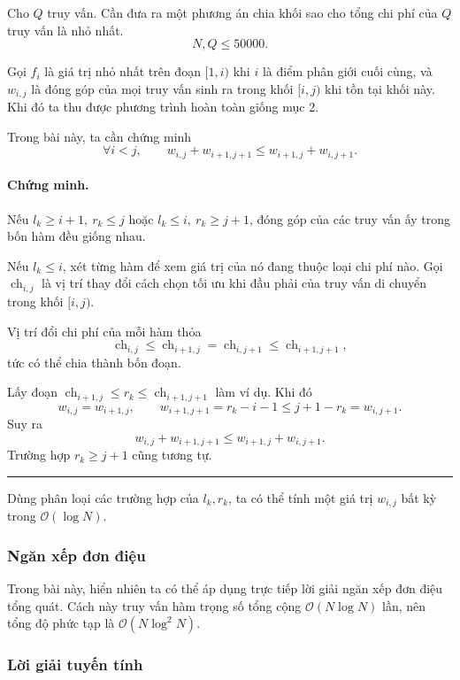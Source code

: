 \documentclass[11pt]{article}
\newcommand{\Oh}{\mathcal{O}}
\newcommand{\qedmark}{\hfill\rule{0.7ex}{0.7ex}}
\begin{document}
Cho \(Q\) truy vấn. Cần đưa ra một phương án chia khối sao cho tổng chi phí
của \(Q\) truy vấn là nhỏ nhất.
\[
  N,Q\le 50000.
\]

Gọi \(f_i\) là giá trị nhỏ nhất trên đoạn \([1,i)\) khi \(i\) là điểm phân
giới cuối cùng, và \(w_{i,j}\) là đóng góp của mọi truy vấn sinh ra trong khối
\([i,j)\) khi tồn tại khối này. Khi đó ta thu được phương trình hoàn toàn giống
mục 2.

Trong bài này, ta cần chứng minh
\[
  \forall i<j,\qquad
  w_{i,j}+w_{i+1,j+1}\le w_{i+1,j}+w_{i,j+1}.
\]

\paragraph{Chứng minh.}
Nếu \(l_k\ge i+1,\ r_k\le j\) hoặc \(l_k\le i,\ r_k\ge j+1\), đóng góp của các
truy vấn ấy trong bốn hàm đều giống nhau.

Nếu \(l_k\le i\), xét từng hàm để xem giá trị của nó đang thuộc loại chi phí
nào. Gọi \(\operatorname{ch}_{i,j}\) là vị trí thay đổi cách chọn tối ưu khi
đầu phải của truy vấn di chuyển trong khối \([i,j)\).

Vị trí đổi chi phí của mỗi hàm thỏa
\[
  \operatorname{ch}_{i,j}\le \operatorname{ch}_{i+1,j}
  =\operatorname{ch}_{i,j+1}\le \operatorname{ch}_{i+1,j+1},
\]
tức có thể chia thành bốn đoạn.

Lấy đoạn
\(\operatorname{ch}_{i+1,j}\le r_k\le \operatorname{ch}_{i+1,j+1}\) làm ví
dụ. Khi đó
\[
  w_{i,j}=w_{i+1,j},\qquad
  w_{i+1,j+1}=r_k-i-1\le j+1-r_k=w_{i,j+1}.
\]
Suy ra
\[
  w_{i,j}+w_{i+1,j+1}\le w_{i+1,j}+w_{i,j+1}.
\]
Trường hợp \(r_k\ge j+1\) cũng tương tự. \qedmark

Dùng phân loại các trường hợp của \(l_k,r_k\), ta có thể tính một giá trị
\(w_{i,j}\) bất kỳ trong \(\Oh(\log N)\).

\subsubsection{Ngăn xếp đơn điệu}

Trong bài này, hiển nhiên ta có thể áp dụng trực tiếp lời giải ngăn xếp đơn
điệu tổng quát. Cách này truy vấn hàm trọng số tổng cộng \(\Oh(N\log N)\) lần,
nên tổng độ phức tạp là \(\Oh(N\log^2 N)\).

\subsubsection{Lời giải tuyến tính}
\end{document}
